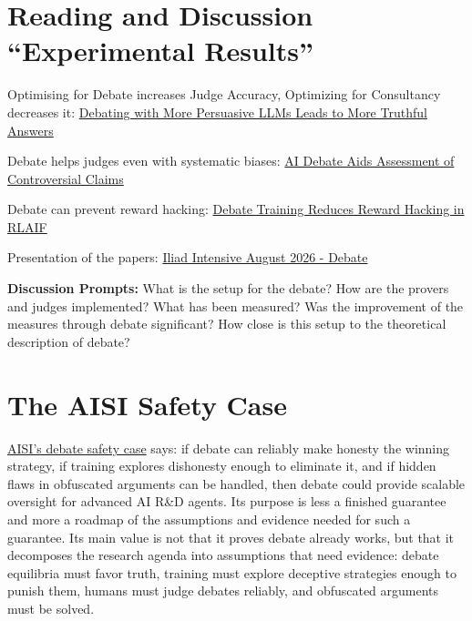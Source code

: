 \documentclass[11pt]{article}
\begin{document}
\section{Reading and Discussion ``Experimental Results''}
\label{sec:experimental}

Optimising for Debate increases Judge Accuracy, Optimizing for Consultancy
decreases it: \href{https://arxiv.org/pdf/2402.06782}{Debating with More
Persuasive LLMs Leads to More Truthful Answers}

Debate helps judges even with systematic biases:
\href{https://arxiv.org/pdf/2506.02175}{AI Debate Aids Assessment of
Controversial Claims}

Debate can prevent reward hacking:
\href{https://arxiv.org/pdf/2608.17776}{Debate Training Reduces Reward Hacking in
RLAIF}

Presentation of the papers: \href{https://docs.google.com/presentation/d/16squLf7HnnGf395UqkM1x7WY4OSuawGCb_fWBq63mns/edit?slide=id.g3f86985783a_0_86\#slide=id.g3f86985783a_0_86}{Iliad Intensive August 2026 - Debate}

\textbf{Discussion Prompts:} What is the setup for the debate? How are the
provers and judges implemented? What has been measured? Was the improvement of
the measures through debate significant? How close is this setup to the
theoretical description of debate?

\section{The AISI Safety Case}
\label{sec:aisi}

\href{https://arxiv.org/abs/2505.03989}{AISI's debate safety case} says: if
debate can reliably make honesty the winning strategy, if training explores
dishonesty enough to eliminate it, and if hidden flaws in obfuscated arguments
can be handled, then debate could provide scalable oversight for advanced AI
R\&D agents. Its purpose is less a finished guarantee and more a roadmap of the
assumptions and evidence needed for such a guarantee. Its main value is not that
it proves debate already works, but that it decomposes the research agenda into
assumptions that need evidence: debate equilibria must favor truth, training must
explore deceptive strategies enough to punish them, humans must judge debates
reliably, and obfuscated arguments must be solved.
\end{document}
